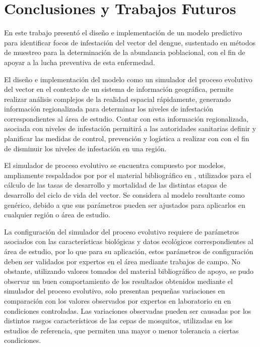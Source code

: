 \chapter{Conclusiones y Trabajos Futuros}
En este trabajo presentó el diseño e implementación de un modelo predictivo para identificar focos
de infestación del vector del dengue, sustentado en métodos de muestreo para la determinación de la
abundancia poblacional, con el fin de apoyar a la lucha preventiva de esta enfermedad.

El diseño e implementación del modelo como un simulador del proceso evolutivo del vector en el
contexto de un  sistema de información geográfica, permite realizar análisis complejos de la
realidad espacial rápidamente, generando información regionalizada para determinar los niveles de
infestación correspondientes al área de estudio. Contar con esta información regionalizada,
asociada con niveles de infestación permitirá a las autoridades sanitarias definir y planificar
las medidas de control, prevención y logística a realizar con con el fin de disminuir los niveles
de infestación en una región.

El simulador de proceso evolutivo se encuentra compuesto por modelos, ampliamente respaldados por
por el material bibliográfico en
\cite{sharpe1977reaction, focks1993dynamic, schoolfield1981non, otero2006stochastic, rueda1990temperature}, utilizados para el cálculo de las tasas de desarrollo y mortalidad de las
distintas etapas de desarrollo del ciclo de vida del vector. Se considera al modelo resultante
como genérico, debido a que sus parámetros pueden ser ajustados para aplicarlos en cualquier
región o área de estudio.

La configuración del simulador del proceso evolutivo requiere de
parámetros asociados con las características biológicas y datos ecológicos correspondientes al
área de estudio, por lo que para su aplicación, estos parámetros de configuración deben ser
validados por expertos en el área mediante trabajos de campo. No obstante, utilizando valores
tomados del material bibliográfico de apoyo, se pudo observar un buen comportamiento de los
resultados obtenidos mediante el simulador del proceso evolutivo, solo presentan pequeñas
variaciones en comparación con los valores observados por expertos en laboratorio en en
condiciones controladas. Las variaciones observadas pueden ser causadas por los distintos rasgos
característicos de las cepas de mosquitos, utilizadas en los estudios de referencia, que permiten
una mayor o menor tolerancia a ciertas condiciones.

